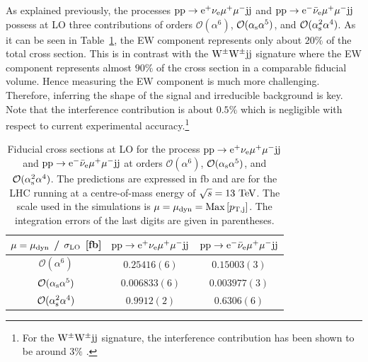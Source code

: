 \documentclass[11pt]{cernrep}
\begin{document}
As explained previously, the processes ${\rm p} {\rm p} \to {\rm e}^+  \nu_{\rm e}  \mu^+ \mu^- {\rm j} {\rm j}$  and ${\rm p} {\rm p} \to {\rm e}^-  \bar \nu_{\rm e}  \mu^+ \mu^- {\rm j} {\rm j}$
possess at LO three contributions of orders $\mathcal{O} (\alpha^6)$, $\mathcal{O} (\alpha_{\rm s}\alpha^5)$, and $\mathcal{O} (\alpha_{\rm s}^2\alpha^4)$.
As it can be seen in Table~\ref{table:xsectallLOdyn}, the EW component represents only about $20\%$ of the total cross section.
This is in contrast with the ${\rm W}^\pm{\rm W}^\pm{\rm j}{\rm j}$ signature where the EW component represents almost $90\%$ of the cross section \cite{Biedermann:2017bss} in a comparable fiducial volume.
Hence measuring the EW component is much more challenging.
Therefore, inferring the shape of the signal and irreducible background is key.
Note that the interference contribution is about $0.5\%$ which is negligible with respect to current experimental accuracy.\footnote{For the ${\rm W}^\pm{\rm W}^\pm{\rm j}{\rm j}$ signature, the interference contribution has been shown to be around $3\%$ \cite{Biedermann:2017bss}.}

\begin{table}
\begin{center} 
\begin{tabular}{ c | c | c }
 $\mu = \mu_{\rm dyn}$ / $\sigma_{\rm LO}$ [fb] & ${\rm p} {\rm p} \to {\rm e}^+  \nu_{\rm e}  \mu^+ \mu^- {\rm j} {\rm j}$  & ${\rm p} {\rm p} \to {\rm e}^-  \bar \nu_{\rm e}  \mu^+ \mu^- {\rm j} {\rm j}$  \\
  \hline\hline
  $\mathcal{O} (\alpha^6)$                        & $0.25416(6)$  & $0.15003(3)$   \\
  $\mathcal{O} (\alpha_{\rm s}\alpha^5)$          & $0.006833(6)$ & $0.003977(3)$  \\
  $\mathcal{O} (\alpha_{\rm s}^2\alpha^4)$        & $0.9912(2)$   & $0.6306(6)$   \\
  \hline
\end{tabular}
\end{center}
\caption{
Fiducial cross sections at LO for the process ${\rm p}{\rm p}\to{\rm e}^+\nu_{\rm e}\mu^+\mu^-{\rm j}{\rm j}$ and ${\rm p}{\rm p}\to{\rm e}^-\bar\nu_{\rm e}\mu^+\mu^-{\rm j}{\rm j}$ at orders $\mathcal{O} (\alpha^6)$, $\mathcal{O} (\alpha_{\rm s}\alpha^5)$, and $\mathcal{O} (\alpha_{\rm s}^2\alpha^4)$.
The predictions are expressed in fb and are for the LHC running at a centre-of-mass energy of $\sqrt{s}=13 {\rm~TeV}$.
The scale used in the simulations is $\mu = \mu_{\rm dyn} = {\rm Max}\left[p_{\rm T, j}\right]$.
The integration errors of the last digits are given in parentheses.}
\label{table:xsectallLOdyn}
\end{table}
\end{document}
